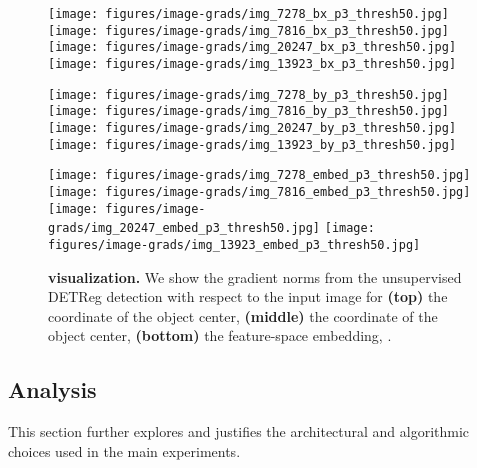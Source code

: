 \begin{figure*}[t]
\centering
\begin{minipage}[t]{0.07\linewidth}
\vspace{-0.57in}
\centering

\end{minipage}\texttt{[image: figures/image-grads/img\_7278\_bx\_p3\_thresh50.jpg]}
\hfill
\texttt{[image: figures/image-grads/img\_7816\_bx\_p3\_thresh50.jpg]}
\hfill
\texttt{[image: figures/image-grads/img\_20247\_bx\_p3\_thresh50.jpg]}
\hfill
\texttt{[image: figures/image-grads/img\_13923\_bx\_p3\_thresh50.jpg]}

\begin{minipage}[t]{0.07\linewidth}
\vspace{-0.57in}
\centering

\end{minipage}\texttt{[image: figures/image-grads/img\_7278\_by\_p3\_thresh50.jpg]}
\hfill
\texttt{[image: figures/image-grads/img\_7816\_by\_p3\_thresh50.jpg]}
\hfill
\texttt{[image: figures/image-grads/img\_20247\_by\_p3\_thresh50.jpg]}
\hfill
\texttt{[image: figures/image-grads/img\_13923\_by\_p3\_thresh50.jpg]}

\begin{minipage}[t]{0.07\linewidth}
\vspace{-0.57in}
\centering

\end{minipage}\texttt{[image: figures/image-grads/img\_7278\_embed\_p3\_thresh50.jpg]}
\hfill
\texttt{[image: figures/image-grads/img\_7816\_embed\_p3\_thresh50.jpg]}
\hfill
\texttt{[image: figures/image-grads/img\_20247\_embed\_p3\_thresh50.jpg]}
\hfill
\texttt{[image: figures/image-grads/img\_13923\_embed\_p3\_thresh50.jpg]}
\caption{\textbf{\model visualization.} We show the gradient norms from the unsupervised DETReg detection with respect to the input image  for \textbf{(top)} the  coordinate of the object center, \textbf{(middle)} the  coordinate of the object center, \textbf{(bottom)} the feature-space embedding, .}
\label{fig:qualitative}
\end{figure*}
 
\subsection{\model Analysis} \label{sec:visualize}
This section further explores and justifies the architectural and algorithmic choices used in the main experiments.
\label{ss:analysis}


